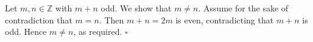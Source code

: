 Let $m, n \in \mathbb{Z}$ with $m + n$ odd.
We show that $m \neq n$.
Assume for the sake of contradiction that $m = n$.
Then $m + n = 2m$ is even, contradicting that $m + n$ is odd.
Hence $m \neq n$, as required. \hfill$\square$